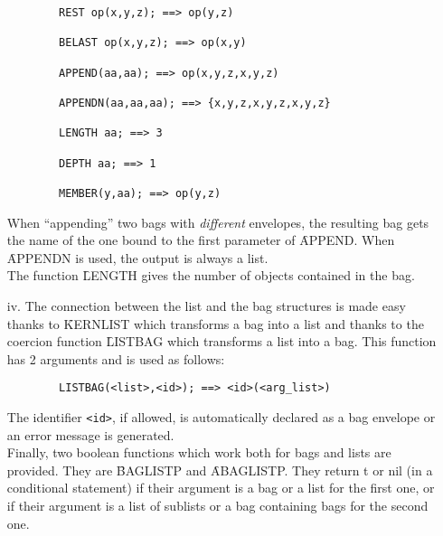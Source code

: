 \begin{itemize}
\begin{verbatim}
        REST op(x,y,z); ==> op(y,z)

        BELAST op(x,y,z); ==> op(x,y)

        APPEND(aa,aa); ==> op(x,y,z,x,y,z)

        APPENDN(aa,aa,aa); ==> {x,y,z,x,y,z,x,y,z}

        LENGTH aa; ==> 3

        DEPTH aa; ==> 1

        MEMBER(y,aa); ==> op(y,z)
\end{verbatim}
When ``appending'' two bags with {\em different} envelopes, the resulting bag
gets the name of the one bound to the first parameter of \f{APPEND}. When  
\f{APPENDN} is used, the output is always a list.\\
The function \f{LENGTH} gives the number of objects contained in the 
bag.
\item[iv.]
The connection between the list and the bag structures is made easy
thanks to \f{KERNLIST} which transforms a bag into a list and thanks to
the coercion function \f{LISTBAG} which transforms a list into a bag. 
This function has 2 arguments
and is used as follows:
\begin{verbatim}
        LISTBAG(<list>,<id>); ==> <id>(<arg_list>)
\end{verbatim}
The identifier \verb+<id>+, if allowed, is automatically declared as a bag
envelope or an error message is generated. \\[3pt]
Finally, two boolean functions which work both for bags and lists are
provided. They are \f{BAGLISTP} and \f{ABAGLISTP}.
They return t or nil (in a conditional statement) if their argument
is a bag or a list for the first one, or if their argument is a list of
sublists or a bag containing bags for the second one.
\end{itemize}
